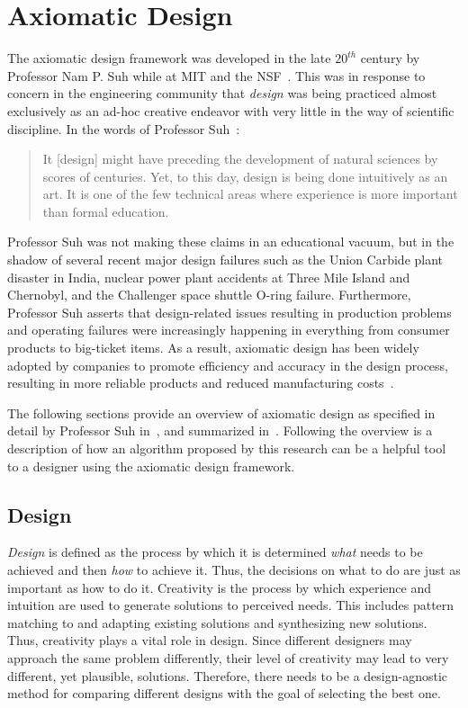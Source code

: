 \section{Axiomatic Design}\label{sec:design}

The axiomatic design framework was developed in the late \(20^{th}\) century by Professor Nam P. Suh while at MIT
and the NSF~\cite{suh}.  This was in response to concern in the engineering community that \emph{design} was being
practiced almost exclusively as an ad-hoc creative endeavor with very little in the way of scientific discipline.
In the words of Professor Suh~\cite{suh}:
\begin{quote}
  It [design] might have preceding the development of natural sciences by scores of centuries.  Yet, to this day,
  design is being done intuitively as an art.  It is one of the few technical areas where experience is more
  important than formal education.
\end{quote}
Professor Suh was not making these claims in an educational vacuum, but in the shadow of several recent major
design failures such as the Union Carbide plant disaster in India, nuclear power plant accidents at Three Mile
Island and Chernobyl, and the Challenger space shuttle O-ring failure.  Furthermore, Professor Suh asserts that
design-related issues resulting in production problems and operating failures were increasingly happening in
everything from consumer products to big-ticket items.  As a result, axiomatic design has been widely adopted by
companies to promote efficiency and accuracy in the design process, resulting in more reliable products and reduced
manufacturing costs~\cite{shirwaiker}.

The following sections provide an overview of axiomatic design as specified in detail by Professor Suh
in~\cite{suh}, and summarized in~\cite{cavallaro,jahanbekam,suh2}.  Following the overview is a description of how
an algorithm proposed by this research can be a helpful tool to a designer using the axiomatic design framework.

\subsection{Design}\label{sec:sub:design}

\emph{Design} is defined as the process by which it is determined \emph{what} needs to be achieved and then
\emph{how} to achieve it.  Thus, the decisions on what to do are just as important as how to do it.  Creativity is
the process by which experience and intuition are used to generate solutions to perceived needs.  This includes
pattern matching to and adapting existing solutions and synthesizing new solutions.  Thus, creativity plays a vital
role in design.  Since different designers may approach the same problem differently, their level of creativity may
lead to very different, yet plausible, solutions.  Therefore, there needs to be a design-agnostic method for
comparing different designs with the goal of selecting the best one.


